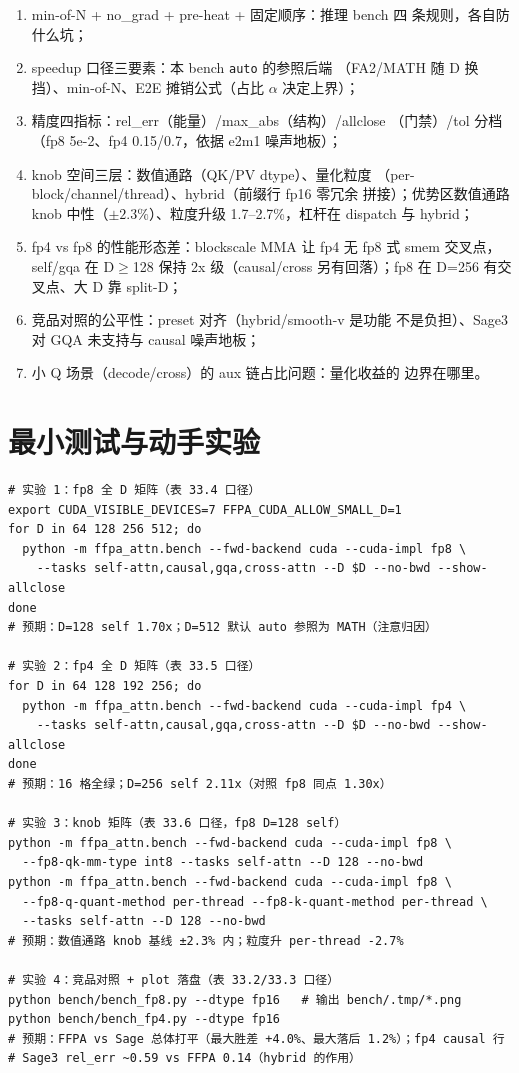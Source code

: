 \begin{enumerate}[itemsep=0pt,topsep=2pt]
  \item min-of-N + no\_grad + pre-heat + 固定顺序：推理 bench 四
        条规则，各自防什么坑；
  \item speedup 口径三要素：本 bench \texttt{auto} 的参照后端
        （FA2/MATH 随 D 换挡）、min-of-N、E2E 摊销公式（占比
        $\alpha$ 决定上界）；
  \item 精度四指标：rel\_err（能量）/max\_abs（结构）/allclose
        （门禁）/tol 分档（fp8 5e-2、fp4 0.15/0.7，依据 e2m1
        噪声地板）；
  \item knob 空间三层：数值通路（QK/PV dtype）、量化粒度
        （per-block/channel/thread）、hybrid（前缀行 fp16 零冗余
        拼接）；优势区数值通路 knob 中性（$\pm2.3\%$）、粒度升级
        1.7--2.7\%，杠杆在 dispatch
        与 hybrid；
  \item fp4 vs fp8 的性能形态差：blockscale MMA 让 fp4 无 fp8 式 smem
        交叉点，self/gqa 在 D$\ge$128 保持 2x 级（causal/cross 另有回落）；fp8 在 D=256 有交叉点、大 D 靠
        split-D；
  \item 竞品对照的公平性：preset 对齐（hybrid/smooth-v 是功能
        不是负担）、Sage3 对 GQA 未支持与 causal 噪声地板；
  \item 小 Q 场景（decode/cross）的 aux 链占比问题：量化收益的
        边界在哪里。
\end{enumerate}

\section{最小测试与动手实验}

\begin{lstlisting}[style=console]
# 实验 1：fp8 全 D 矩阵（表 33.4 口径）
export CUDA_VISIBLE_DEVICES=7 FFPA_CUDA_ALLOW_SMALL_D=1
for D in 64 128 256 512; do
  python -m ffpa_attn.bench --fwd-backend cuda --cuda-impl fp8 \
    --tasks self-attn,causal,gqa,cross-attn --D $D --no-bwd --show-allclose
done
# 预期：D=128 self 1.70x；D=512 默认 auto 参照为 MATH（注意归因）

# 实验 2：fp4 全 D 矩阵（表 33.5 口径）
for D in 64 128 192 256; do
  python -m ffpa_attn.bench --fwd-backend cuda --cuda-impl fp4 \
    --tasks self-attn,causal,gqa,cross-attn --D $D --no-bwd --show-allclose
done
# 预期：16 格全绿；D=256 self 2.11x（对照 fp8 同点 1.30x）

# 实验 3：knob 矩阵（表 33.6 口径，fp8 D=128 self）
python -m ffpa_attn.bench --fwd-backend cuda --cuda-impl fp8 \
  --fp8-qk-mm-type int8 --tasks self-attn --D 128 --no-bwd
python -m ffpa_attn.bench --fwd-backend cuda --cuda-impl fp8 \
  --fp8-q-quant-method per-thread --fp8-k-quant-method per-thread \
  --tasks self-attn --D 128 --no-bwd
# 预期：数值通路 knob 基线 ±2.3% 内；粒度升 per-thread -2.7%

# 实验 4：竞品对照 + plot 落盘（表 33.2/33.3 口径）
python bench/bench_fp8.py --dtype fp16   # 输出 bench/.tmp/*.png
python bench/bench_fp4.py --dtype fp16
# 预期：FFPA vs Sage 总体打平（最大胜差 +4.0%、最大落后 1.2%）；fp4 causal 行
# Sage3 rel_err ~0.59 vs FFPA 0.14（hybrid 的作用）
\end{lstlisting}

